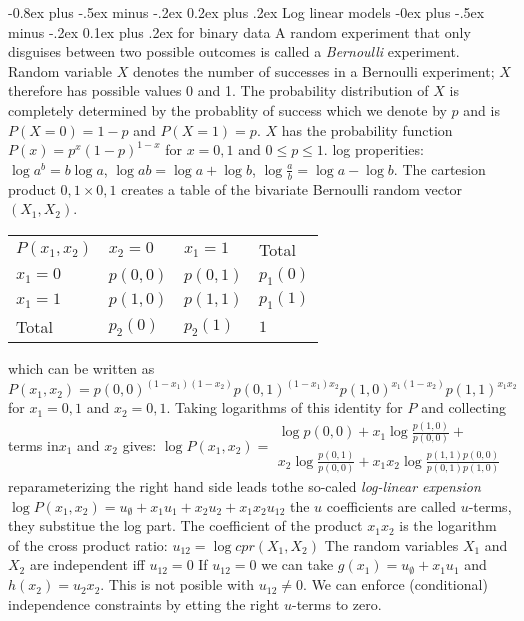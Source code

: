 \documentclass[8pt,landscape]{extarticle}
\makeatletter
\renewcommand{\subsection}{\@startsection{subsection}{2}{0mm}%
                                {-0.8ex plus -.5ex minus -.2ex}%
                                {0.2ex plus .2ex}%
                                {\normalfont\normalsize\bfseries}}
\renewcommand{\subsubsection}{\@startsection{subsubsection}{3}{0mm}%
                                {-0ex plus -.5ex minus -.2ex}%
                                {0.1ex plus .2ex}%
                                {\normalfont\small\bfseries}}
\makeatother
\begin{document}
\begin{multicols}{3}
\subsection{Log linear models}
\subsubsection{for binary data}
A random experiment that only disguises between two possible outcomes is
called a \emph{Bernoulli} experiment. Random variable $X$ denotes the number of
successes in a Bernoulli experiment; $X$ therefore has possible values 0 and 1.
The probability distribution of $X$ is completely determined by the probablity of
success which we denote by $p$  and is $P(X=0) = 1 - p $ and $ P(X=1)=p$.
$X$ has the probability function $P(x)=p^x(1-p)^{1-x}$ for $x=0,1$ and
$0 \leq p \leq 1$.
log properities: $\log a^b=b \log a$, $\log ab = \log a + \log b$,
$\log \frac{a}{b}=\log a - \log b$.
The cartesion product 
${0,1} \times {0,1}$ creates a table of the bivariate Bernoulli random
vector $(X_1,X_2)$.
\begin{tabular}{llll}
  $P(x_1,x_2)$ & $x_2=0$ & $x_1=1$ & Total \\
  $x_1=0$ & $p(0,0)$ & $p(0,1)$ & $p_1(0)$ \\
  $x_1=1$ & $p(1,0)$ & $p(1,1)$ & $p_1(1)$ \\
  Total & $p_2(0)$ & $p_2(1)$ & $1$ \\
\end{tabular}
which can be written as
$P(x_1,x_2)=p(0,0)^{(1-x_1)(1-x_2)}p(0,1)^{(1-x_1)x_2}p(1,0)^{x_1(1-x_2)}p(1,1)^{x_1x_2}$
for $x_1=0,1$ and $x_2=0,1$.
Taking logarithms of this identity for $P$ and collecting terms in$x_1$ and
$x_2$ gives:
$\log P(x_1,x_2)= \begin{matrix}
    \log p(0,0) + x_1 \log \frac{p(1,0)}{p(0,0)} +  \\
    x_2 \log \frac{p(0,1)}{p(0,0)} + x_1 x_2 \log \frac{p(1,1)p(0,0)}{p(0,1)p(1,0)}
    \end{matrix}
$
reparameterizing the right hand side leads tothe so-caled \emph{log-linear expension}
$\log P(x_1,x_2)=u_\emptyset+ x_1u_1 + x_2 u_2 + x_1 x_2 u_{12}$
the $u$ coefficients are called $u$-terms, they substitue the log part.
The coefficient of the product $x_1x_2$ is the logarithm of the cross product
ratio:
$u_{12}=\log cpr(X_1,X_2)$
The random variables $X_1$ and $X_2$ are independent iff $u_{12}=0$
If $u_{12}=0$ we can take $g(x_1)=u_\emptyset + x_1 u_1$ and $h(x_2)= u_2 x_2$.
This is not posible with $u_{12}\neq 0$.
We can enforce (conditional) independence constraints by etting the right
$u$-terms to zero.

\end{multicols}
\end{document}
